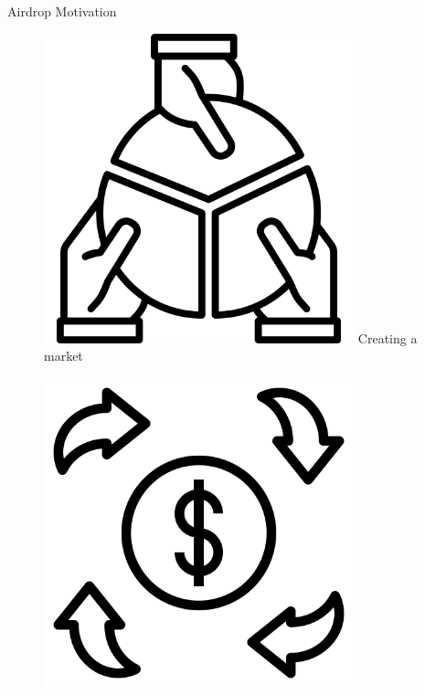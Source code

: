 \documentclass[handout]{beamer}
\begin{document}


\begin{frame}{Airdrop Motivation}
  \begin{figure}[H]
  \begin{minipage}[t]{.2\textwidth}\vspace{20pt}%
  	\center 
	\includegraphics[width=0.8\textwidth]{../assets/images/sharing.png}
	\vspace{0.8em}\vspace{0.8em}   
    Creating a market
  \end{minipage}
    \hfill
  \begin{minipage}[t]{.2\textwidth}\vspace{20pt}%
  	\center 
	\includegraphics[width=0.8\textwidth]{../assets/images/trading.png}

\end{minipage}
\end{figure}
\end{frame}
\end{document}
